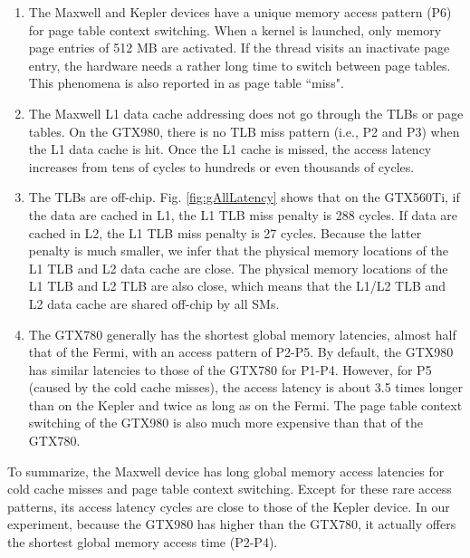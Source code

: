 \documentclass[10pt,journal,compsoc]{IEEEtran}
\theoremstyle{definition}
\begin{document}
\begin{enumerate}

\item The Maxwell and Kepler devices have a unique memory access pattern (P6) for page table context switching. When a kernel is launched, only memory page entries of 512 MB are activated. If the thread visits an inactivate page entry, the hardware needs a rather long time to switch between page tables. This phenomena is also reported in \cite{meltzer2013micro} as page table ``miss".

\item The Maxwell L1 data cache addressing does not go through the TLBs or page tables. On the GTX980, there is no TLB miss pattern (i.e., P2 and P3) when the L1 data cache is hit. Once the L1 cache is missed, the access latency increases from tens of cycles to hundreds or even thousands of cycles.

\item The TLBs are off-chip. Fig. \ref{fig:gAllLatency} shows that on the GTX560Ti, if the data are cached in L1, the L1 TLB miss penalty is 288 cycles. If data are cached in L2, the L1 TLB miss penalty is 27 cycles. Because the latter penalty is much smaller, we infer that the physical memory locations of the L1 TLB and L2 data cache are close. The physical memory locations of the L1 TLB and L2 TLB are also close, which means that the L1/L2 TLB and L2 data cache are shared off-chip by all SMs.



\item The GTX780 generally has the shortest global memory latencies, almost half that of the Fermi, with an access pattern of P2-P5. By default, the GTX980 has similar latencies to those of the GTX780 for P1-P4. However, for P5 (caused by the cold cache misses), the access latency is about 3.5 times longer than on the Kepler and twice as long as on the Fermi. The page table context switching of the GTX980 is also much more expensive than that of the GTX780.

\end{enumerate}

To summarize, the Maxwell device has long global memory access latencies for cold cache misses and page table context switching. Except for these rare access patterns, its access latency cycles are close to those of the Kepler device. In our experiment, because the GTX980 has higher  than the GTX780, it actually offers the shortest global memory access time (P2-P4).
\end{document}

